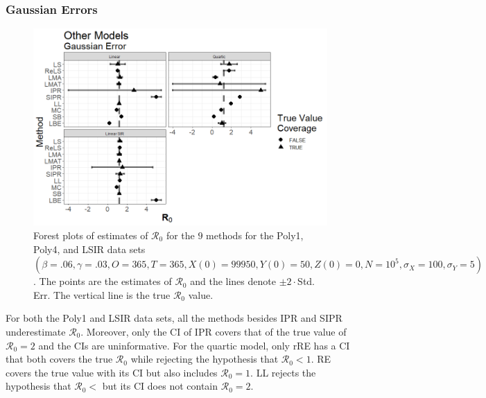 \documentclass[12pt]{article}
\newcommand{\xxsir}{\ensuremath{9} } %
\newcommand{\rr}{\ensuremath{\mathcal{R}_0}}
\begin{document}
\subsubsection{Gaussian Errors}

\begin{figure}[H]
  \begin{center}
    \includegraphics[scale=0.5]{images/other_n.tiff}
  \caption{Forest plots of estimates of $\rr$ for the \xxsir methods for the Poly1, Poly4, and LSIR data sets $(\beta=.06, \gamma=.03, O=365, T=365, X(0)=99950, Y(0)=50, Z(0)=0, N=10^5, \sigma_X=100, \sigma_Y=5)$.  The points are the estimates of $\rr$ and the lines denote $\pm 2\cdot $Std. Err.  The vertical line is the true $\rr$ value.}
  \label{fig:other-res}	
  \end{center}
\end{figure}

For both the Poly1 and LSIR data sets, all the methods besides IPR and SIPR underestimate $\rr$.  Moreover, only the CI of IPR covers that of the true value of $\rr=2$ and the CIs are uninformative.  For the quartic model, only rRE has a CI that both covers the true $\rr$ while rejecting the hypothesis that $\rr < 1$.  RE covers the true value with its CI but also includes $\rr=1$.  LL rejects the hypothesis that $\rr <$ but its CI does not contain $\rr=2$.
\end{document}
